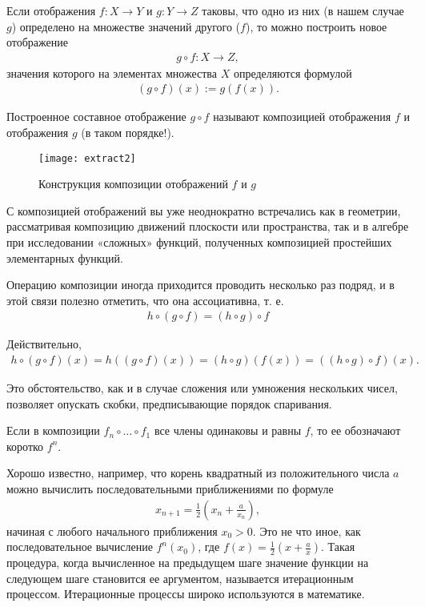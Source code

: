 \documentclass[14pt]{extreport}
\begin{document}
Если отображения $f\colon X \to Y$ и $g\colon Y \to Z$ таковы, что одно из них (в нашем
случае $g$) определено на множестве значений другого ($f$), то можно построить новое отображение
\begin{eqnarray}
g \circ f\colon X \to Z,
\end{eqnarray}
значения которого на элементах множества $X$ определяются формулой
\begin{eqnarray}
(g \circ f)(x) := g(f(x)).
\end{eqnarray}

Построенное составное отображение $g \circ f$ называют композицией отображения $f$ и отображения $g$ (в таком порядке!).

\begin{figure}[H]
\centerline{\texttt{[image: extract2]}}
\caption{Конструкция композиции отображений $f$ и $g$}
\label{fig12}
\end{figure}

С композицией отображений вы уже неоднократно встречались как в геометрии, рассматривая композицию движений плоскости или пространства,
так и в алгебре при исследовании «сложных» функций, полученных композицией простейших элементарных функций.

Операцию композиции иногда приходится проводить несколько раз подряд, и в этой связи полезно отметить, что она ассоциативна, т. е.
\begin{eqnarray}
h \circ (g \circ f)=(h \circ g) \circ f
\end{eqnarray}

Действительно,
\begin{eqnarray}
h \circ (g \circ f)(x)=h((g \circ f)(x))=(h \circ g)(f(x))=((h \circ g) \circ f)(x).
\end{eqnarray}

Это обстоятельство, как и в случае сложения или умножения нескольких
чисел, позволяет опускать скобки, предписывающие порядок спаривания.

Если в композиции $f_n \circ \dots \circ f_1$ все члены одинаковы и равны $f$, то ее обозначают коротко $f^n$.

Хорошо известно, например, что корень квадратный из положительного
числа $a$ можно вычислить последовательными приближениями по формуле
\begin{eqnarray}
x_{n+1}=\frac{1}{2} (x_n + \frac{a}{x_n}),
\end{eqnarray}
начиная с любого начального приближения $x_0>0$. Это не что иное, как последовательное вычисление $f^n(x_0)$, где $f(x)=\frac{1}{2}(x+\frac{a}{x})$. Такая процедура, когда вычисленное на предыдущем шаге значение функции на следующем
шаге становится ее аргументом, называется итерационным процессом. Итерационные процессы широко используются в математике.
\end{document}
